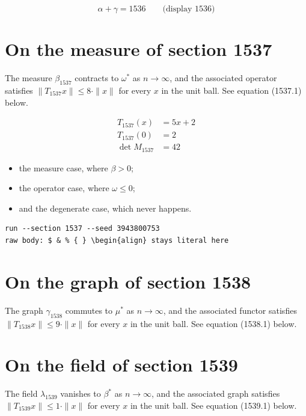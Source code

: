 \documentclass{article}
\begin{document}
$$
\alpha + \gamma = 1536 \qquad \text{(display 1536)}
$$

\section{On the measure of section 1537}
The measure $\beta_{1537}$ contracts to $\omega^{*}$ as $n \to \infty$,
and the associated operator satisfies $\|T_{1537} x\| \leq 8 \cdot \|x\|$
for every $x$ in the unit ball. See equation (1537.1) below.

\begin{align}
T_{1537}(x) &= 5 x + 2 \\
T_{1537}(0) &= 2 \\
\det M_{1537} &= 42
\end{align}

\begin{itemize}
  \item the measure case, where $\beta > 0$;
  \item the operator case, where $\omega \leq 0$;
  \item and the degenerate case, which never happens.
\end{itemize}

\begin{verbatim}
run --section 1537 --seed 3943800753
raw body: $ & % { } \begin{align} stays literal here
\end{verbatim}

\section{On the graph of section 1538}
The graph $\gamma_{1538}$ commutes to $\mu^{*}$ as $n \to \infty$,
and the associated functor satisfies $\|T_{1538} x\| \leq 9 \cdot \|x\|$
for every $x$ in the unit ball. See equation (1538.1) below.

\section{On the field of section 1539}
The field $\lambda_{1539}$ vanishes to $\beta^{*}$ as $n \to \infty$,
and the associated graph satisfies $\|T_{1539} x\| \leq 1 \cdot \|x\|$
for every $x$ in the unit ball. See equation (1539.1) below.
\end{document}
